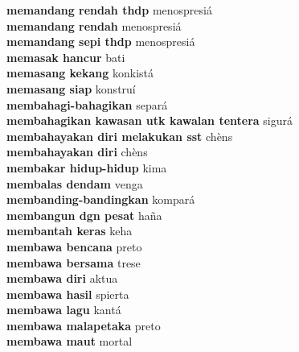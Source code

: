 \textbf{ memandang rendah thdp  } menospresiá \\
\textbf{ memandang rendah  } menospresiá \\
\textbf{ memandang sepi thdp  } menospresiá \\
\textbf{ memasak hancur  } bati \\
\textbf{ memasang kekang  } konkistá \\
\textbf{ memasang siap  } konstruí \\
\textbf{ membahagi-bahagikan  } separá \\
\textbf{ membahagikan kawasan utk kawalan tentera  } sigurá \\
\textbf{ membahayakan diri melakukan sst  } chèns \\
\textbf{ membahayakan diri  } chèns \\
\textbf{ membakar hidup-hidup  } kima \\
\textbf{ membalas dendam  } venga \\
\textbf{ membanding-bandingkan  } kompará \\
\textbf{ membangun dgn pesat  } haña \\
\textbf{ membantah keras  } keha \\
\textbf{ membawa bencana  } preto \\
\textbf{ membawa bersama  } trese \\
\textbf{ membawa diri  } aktua \\
\textbf{ membawa hasil  } spierta \\
\textbf{ membawa lagu  } kantá \\
\textbf{ membawa malapetaka  } preto \\
\textbf{ membawa maut  } mortal \\
